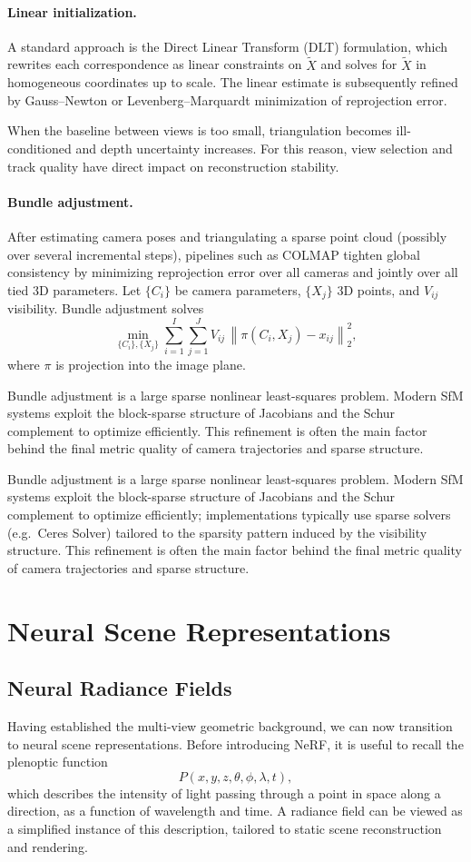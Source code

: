 \paragraph{Linear initialization.}
A standard approach is the Direct Linear Transform (DLT) formulation, which rewrites each correspondence as linear constraints on $\tilde{X}$ and solves for $\tilde{X}$ in homogeneous coordinates up to scale. The linear estimate is subsequently refined by Gauss--Newton or Levenberg--Marquardt minimization of reprojection error.

When the baseline between views is too small, triangulation becomes ill-conditioned and depth uncertainty increases. For this reason, view selection and track quality have direct impact on reconstruction stability.

\paragraph{Bundle adjustment.}
After estimating camera poses and triangulating a sparse point cloud (possibly over several incremental steps), pipelines such as COLMAP tighten global consistency by minimizing reprojection error over all cameras and jointly over all tied 3D parameters. Let $\{C_i\}$ be camera parameters, $\{X_j\}$ 3D points, and $V_{ij}$ visibility. Bundle adjustment solves
\[
\min_{\{C_i\},\{X_j\}}
\sum_{i=1}^{I}\sum_{j=1}^{J}V_{ij}\,
\left\|
\pi(C_i, X_j)-x_{ij}
\right\|_2^2,
\]
where $\pi$ is projection into the image plane.

Bundle adjustment is a large sparse nonlinear least-squares problem. Modern SfM systems exploit the block-sparse structure of Jacobians and the Schur complement to optimize efficiently. This refinement is often the main factor behind the final metric quality of camera trajectories and sparse structure.

Bundle adjustment is a large sparse nonlinear least-squares problem. Modern SfM systems exploit the block-sparse structure of Jacobians and the Schur complement to optimize efficiently; implementations typically use sparse solvers (e.g.\ Ceres Solver) tailored to the sparsity pattern induced by the visibility structure. This refinement is often the main factor behind the final metric quality of camera trajectories and sparse structure.


\section{Neural Scene Representations}
\subsection{Neural Radiance Fields}
Having established the multi-view geometric background, we can now transition to neural scene representations. Before introducing NeRF, it is useful to recall the plenoptic function
\[
P(x,y,z,\theta,\phi,\lambda,t),
\]
which describes the intensity of light passing through a point in space along a direction, as a function of wavelength and time. A radiance field can be viewed as a simplified instance of this description, tailored to static scene reconstruction and rendering.

